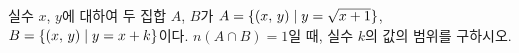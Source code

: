 \hspace*{2mm}\begin{minipage}[t]{\dimexpr\linewidth-2mm\relax}\vspace{0pt}
실수 $x$, $y$에 대하여 두 집합 $A$, $B$가 $A=\{(x,\mkern3mu y)\mid y=\sqrt{x+1}\}$, $B=\{(x,\mkern3mu y)\mid y=x+k\}$이다. $n(A\cap B)=1$일 때, 실수 $k$의 값의 범위를 구하시오.\end{minipage}
